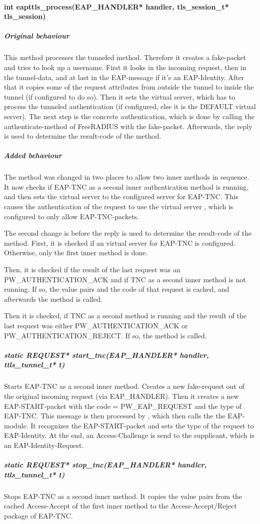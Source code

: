 \paragraph{int eapttls\_process(EAP\_HANDLER* handler, tls\_session\_t* tls\_session)}
\subparagraph{Original behaviour}
This method processes the tunneled method.
Therefore it creates a fake-packet and tries to look up a username.
First it looks in the incoming request, then in the tunnel-data, and at last in the EAP-message if it's an EAP-Identity.
After that it copies some of the request attributes from outside the tunnel to inside the tunnel (if configured to do so).
Then it sets the virtual server, which has to process the tunneled authentication (if configured, else it is the DEFAULT virtual server).
The next step is the concrete authentication, which is done by calling the authenticate-method of FreeRADIUS with the fake-packet.
Afterwards, the reply is used to determine the result-code of the method.

\subparagraph{Added behaviour}
The method was changed in two places to allow two inner methods in sequence.
It now checks if EAP-TNC as a second inner authentication method is running, and then sets the virtual server to the configured server for EAP-TNC.
This causes the authentication of the request to use the virtual server , which is configured to only allow EAP-TNC-packets.
\par
The second change is before the reply is used to determine the result-code of the method.
First, it is checked if an virtual server for EAP-TNC is configured.
Otherwise, only the first inner method is done.
\par
Then, it is checked if the result of the last request was an PW\-\_AUTHENTICATION\-\_ACK and if TNC as a second inner method is not running.
If so, the value pairs and the code of that request is cached, and afterwards the method  is called.
\par
Then it is checked, if TNC as a second method is running and the result of the last request was either PW\-\_AUTHENTICATION\-\_ACK or PW\-\_AUTHENTICATION\-\_REJECT.
If so, the method  is called.

\subparagraph{static REQUEST* start\_tnc(EAP\_HANDLER* handler, ttls\_tunnel\_t* t)}
Starts EAP-TNC as a second inner method.
Creates a new fake-request out of the original incoming request (via EAP\_HANDLER).
Then it creates a new EAP-START-packet with the code = PW\-\_EAP\-\_REQUEST and the type of EAP-TNC.
This message is then processed by , which then calls the the EAP-module.
It recognizes the EAP-START-packet and sets the type of the request to EAP-Identity.
At the end, an Access-Challenge is send to the supplicant, which is an EAP-Identity-Request.

\subparagraph{static REQUEST* stop\_tnc(EAP\_HANDLER* handler, ttls\_tunnel\_t* t)}
Stops EAP-TNC as a second inner method.
It copies the value pairs from the cached Access-Accept of the first inner method to the Access-Accept/Reject package of EAP-TNC.

